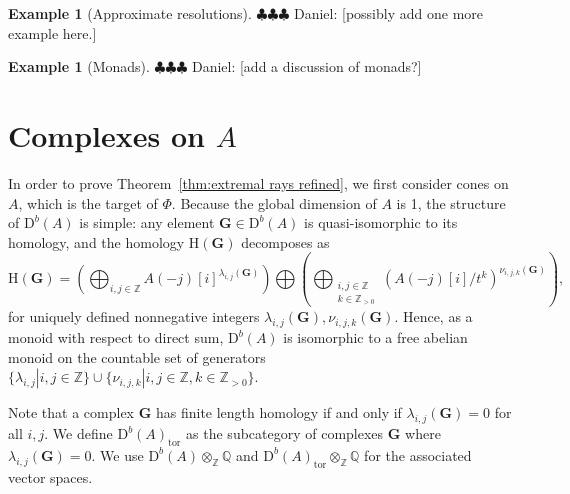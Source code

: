 \documentclass[12pt]{amsart}
\theoremstyle{definition}
\newtheorem{example}[lemma]{Example}
\theoremstyle{remark}
\newcommand{\HH}{\mathrm{H}}
\newcommand{\ZZ}{\mathbb{Z}}
\newcommand{\QQ}{\mathbb{Q}}
\newcommand{\Gbull}{\mathbf{G}}
\newcommand{\DD}{\mathrm{D}}
\newcommand{\daniel}[1]{{\color{green} \sf $\clubsuit\clubsuit\clubsuit$ Daniel: [#1]}}
\begin{document}
\begin{example}[Approximate resolutions]
\daniel{possibly add one more example here.}
\end{example}

\begin{example}[Monads]
\daniel{add a discussion of monads?}
\end{example}







\section{Complexes on $A$}\label{sec:A}
In order to prove Theorem~\ref{thm:extremal rays refined}, we first consider cones on $A$, which is the target of $\Phi$.  Because the global dimension of $A$ is 1, the structure of $\DD^b(A)$ is simple: any element $\Gbull\in \DD^b(A)$ is quasi-isomorphic to its homology, and the homology $\HH(\Gbull)$ decomposes as
\[
\HH(\Gbull)=\left( \bigoplus_{i,j\in \ZZ} A(-j)[i]^{\lambda_{i,j}(\Gbull)}\right) \bigoplus \left( \bigoplus_{\substack{i,j\in \ZZ\\ k\in \ZZ_{>0}}} (A(-j)[i]/t^k)^{\nu_{i,j,k}(\Gbull)}\right),
\]
for uniquely defined nonnegative integers $\lambda_{i,j}(\Gbull), \nu_{i,j,k}(\Gbull)$.  Hence, as a monoid with respect to direct sum, $\DD^b(A)$ is isomorphic to a free abelian monoid on the countable set of generators $\{\lambda_{i,j} | i,j\in \ZZ\} \cup \{ \nu_{i,j,k}  | i,j\in \ZZ, k\in \ZZ_{>0}\}$. 

Note that a complex $\Gbull$ has finite length homology if and only if $\lambda_{i,j}(\Gbull)=0$ for all $i,j$.  We  define $\DD^b(A)_{\text{tor}}$ as the subcategory of complexes $\Gbull$ where $\lambda_{i,j}(\Gbull)=0$.  We use $\DD^b(A)\otimes_{\ZZ} \QQ$ and $\DD^b(A)_{\text{tor}}\otimes_{\ZZ} \QQ$ for the associated vector spaces.
\end{document}
